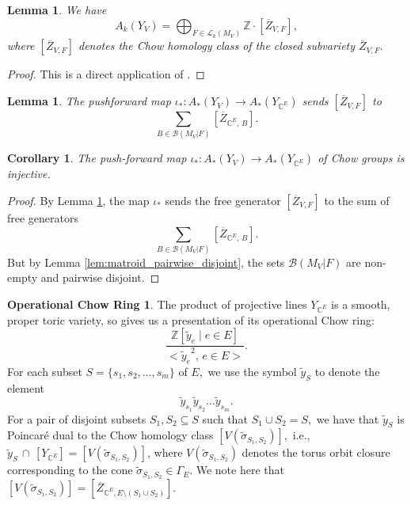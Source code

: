 \documentclass{amsart}
\theoremstyle{plain}
\newtheorem{corollary}[theorem]{Corollary}
\newtheorem{lemma}[theorem]{Lemma}
\theoremstyle{definition}
\newtheorem{opchowring}[theorem]{Operational Chow Ring}
\begin{document}
\begin{lemma}
\label{lem:chow_group}
We have
\[A_k(Y_V) = \bigoplus_{F \in \mathcal{L}_k(M_V)}\mathbb{Z} \cdot [\overline{Z}_{V,F}],\]
where $[\overline{Z}_{V,F}]$ denotes the Chow homology class of the closed subvariety $\overline{Z}_{V,F}.$
\end{lemma}
\begin{proof}
This is a direct application of \cite[Corollary to Theorem 1]{llompart_descamps}.
\end{proof}

\begin{lemma}
\label{lem:pushforward_descr}
\cite[Lemma 9.3]{stellahedral}
The pushforward map $\iota_*: A_*(Y_V) \to A_*(Y_{\mathbb{C}^E})$ sends $[\overline{Z}_{V, F}]$ to
\[\sum_{B \in \mathcal{B}(M_V | F)} [\overline{Z}_{\mathbb{C}^E,\, B}].\]
\end{lemma}

\begin{corollary}
\label{cor:pushforward_injective}
The push-forward map $\iota_*: A_*(Y_V) \to A_*(Y_{\mathbb{C}^E})$ of Chow groups is injective.
\end{corollary}
\begin{proof}
By Lemma \ref{lem:pushforward_descr}, the map $\iota_*$ sends the free generator $[\overline{Z}_{V,F}]$ to the sum of free generators
\[\sum_{B \in \mathcal{B}(M_V | F)} [\overline{Z}_{\mathbb{C}^E,\, B}].\]
But by Lemma \ref{lem:matroid_pairwise_disjoint}, the sets $\mathcal{B}(M_V | F)$ are non-empty and pairwise disjoint.
\end{proof}

\begin{opchowring}
The product of projective lines $Y_{\mathbb{C}^E}$ is a smooth, proper toric variety, so \cite[Theorem 10.8]{danilov} gives us a presentation of its operational Chow ring:
\begin{equation*}
\frac{\mathbb{Z}[\tilde{y}_e \mid e \in E]}{<{{\tilde{y}_e}^2}, \, e\in E >}.
\end{equation*}
For each subset $S = \{s_1, s_2,\dots,s_m\}$ of $E,$ we use the symbol $\tilde{y}_S$ to denote the element
\[\tilde{y}_{s_1}\tilde{y}_{s_2}\dots\tilde{y}_{s_m}.\]
For a pair of disjoint subsets $S_1, S_2 \subseteq S$ such that $S_1 \cup S_2 = S,$
we have that $\tilde{y}_S$ is Poincar\'e dual to the Chow homology class $[V(\tilde{\sigma}_{S_1, S_2})],$ i.e., $\tilde{y}_S \, \cap \, [Y_{\mathbb{C}^E}] = [V(\tilde{\sigma}_{S_1, S_2})]$, where $V(\tilde{\sigma}_{S_1, S_2})$ denotes the torus orbit closure corresponding to the cone $\tilde{\sigma}_{S_1, S_2} \in \Gamma_E.$ We note here that $[V(\tilde{\sigma}_{S_1, S_2})] =[\overline{Z}_{\mathbb{C}^E, E \setminus (S_1 \cup S_2)}].$    
\end{opchowring}
\end{document}
